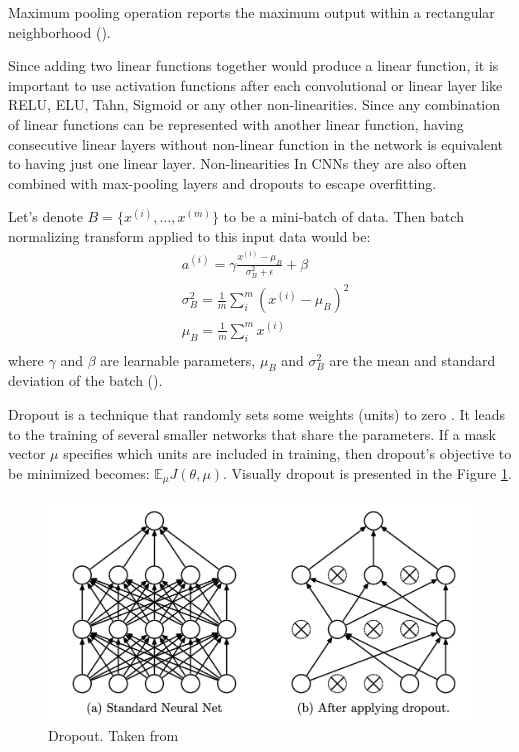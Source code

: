 \begin{definition}
	Maximum pooling operation reports the maximum output within a rectangular neighborhood (\cite{Goodfellow_2016}).
\end{definition}


Since adding two linear functions together would produce a linear function, it is important to use activation functions after each convolutional or linear layer like RELU, ELU, Tahn, Sigmoid or any other non-linearities. Since any combination of linear functions can be represented with another linear function, having consecutive linear layers without non-linear function in the network is equivalent to having just one linear layer. Non-linearities  In CNNs they are also often combined with max-pooling layers and dropouts to escape overfitting. 

\begin{definition}
	Let's denote $B = \{x^{(i)}, ..., x^{(m)}\}$ to be a mini-batch of data. Then batch normalizing transform applied to this input data would be:
	\begin{equation}
		\begin{split}
		& a^{(i)} = \gamma \frac{x^{(i)} - \mu_B}{\sigma^2_B + \epsilon} + \beta \\
		& \sigma^2_B = \frac{1}{m} \sum_i^m (x^{(i)} - \mu_B)^2 \\
		& \mu_B = \frac{1}{m} \sum_i^m x^{(i)} \\
		\end{split}
	\end{equation}
	where $\gamma$ and $\beta$ are learnable parameters, $\mu_B$ and $\sigma^2_B$ are the mean and standard deviation of the batch (\cite{Ioffe_2015}).
\end{definition}

\begin{definition}
	Dropout is a technique that randomly sets some weights (units) to zero \cite{Srivastava_2014}. It leads to the training of several smaller networks that share the parameters. If a mask vector $\mu$ specifies which units are included in training, then dropout's objective to be minimized becomes: $\mathbb{E}_\mu J(\theta, \mu)$. Visually dropout is presented in the Figure \ref{fig:dropout}.
\end{definition}

\begin{figure}[H]
	\begin{center}
		\includegraphics[width=0.5\linewidth]{bilder/dropout.png}
		\caption[Dropout]%
		{Dropout. Taken from \cite{Srivastava_2014}}
		\label{fig:dropout}
	\end{center}
\end{figure}

